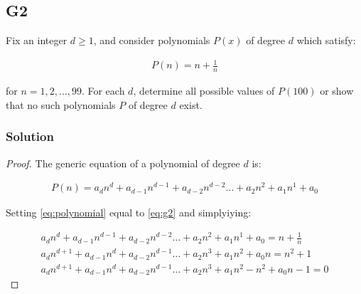 \subsection*{G2}

Fix an integer $d \geq 1$, and consider polynomials $P(x)$ of degree $d$ which satisfy:

\begin{gather} \label{eq:g2}
    P(n) = n + \frac{1}{n}
\end{gather}

for $n = 1, 2, \dots, 99$. For each $d$, determine all possible values of $P(100)$ or show that no
such polynomials $P$ of degree $d$ exist.

\subsubsection*{Solution}

\begin{proof}

The generic equation of a polynomial of degree $d$ is:

\begin{gather} \label{eq:polynomial}
    P(n) = a_{d}n^{d} + a_{d-1}n^{d-1} + a_{d-2}n^{d-2} \dots + a_{2}n^{2} + a_{1}n^{1} + a_{0}
\end{gather}

Setting \ref{eq:polynomial} equal to \ref{eq:g2} and simplyiying:

\begin{gather}
    a_{d}n^{d} + a_{d-1}n^{d-1} + a_{d-2}n^{d-2} \dots + a_{2}n^{2} + a_{1}n^{1} + a_{0} = n + \frac{1}{n} \\
    a_{d}n^{d+1} + a_{d-1}n^{d} + a_{d-2}n^{d-1} \dots + a_{2}n^{3} + a_{1}n^{2} + a_{0}n = n^{2} + 1 \\
    a_{d}n^{d+1} + a_{d-1}n^{d} + a_{d-2}n^{d-1} \dots + a_{2}n^{3} + a_{1}n^{2} - n^{2} + a_{0}n - 1 = 0
\end{gather}

\end{proof}